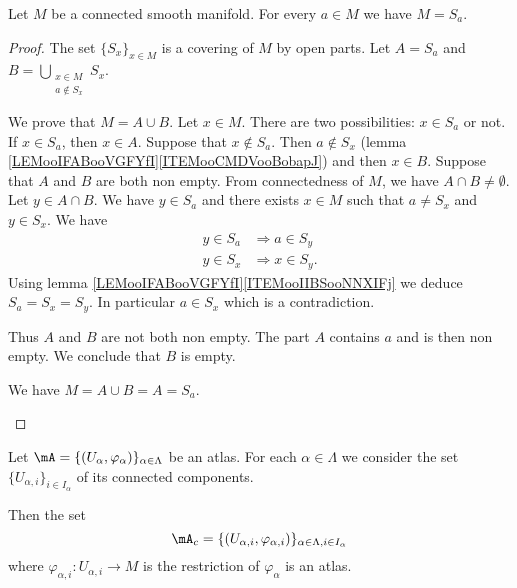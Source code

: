 \begin{proposition}		\label{PROPooFTFCooYTKaPF}
	Let \( M\) be a connected smooth manifold. For every \( a\in M\) we have \( M=S_a\).
\end{proposition}

\begin{proof}
	The set \( \{ S_x \}_{x\in M}\) is a covering of \( M\) by open parts. Let \( A=S_a\) and \( B=\bigcup_{\substack{ x\in M \\ a\not\in S_x }  }S_x \).
	\begin{subproof}
		\spitem[\( M=A\cup B\)]
		We prove that \( M=A\cup B\). Let \( x\in M\). There are two possibilities: \( x\in S_a\) or not. If \( x\in S_a\), then \( x\in A\). Suppose that \( x\not\in S_a\). Then \( a\not\in S_x\) (lemma \ref{LEMooIFABooVGFYfI}\ref{ITEMooCMDVooBobapJ}) and then \( x\in B\).
		\spitem[\( B=\emptyset\)]
		Suppose that \( A\) and \( B\) are both non empty. From connectedness of \( M\), we have \( A\cap B\neq\emptyset\). Let \( y\in A\cap B\). We have \( y\in S_a\) and there exists \( x\in M\) such that \( a\neq S_x\) and \( y\in S_x\). We have
		\begin{subequations}
			\begin{align}
				y\in S_a & \Rightarrow a\in S_y  \\
				y\in S_x & \Rightarrow x\in S_y.
			\end{align}
		\end{subequations}
		Using lemma \ref{LEMooIFABooVGFYfI}\ref{ITEMooIIBSooNNXIFj} we deduce \( S_a=S_x=S_y\). In particular \( a\in S_x\) which is a contradiction.

		Thus \( A\) and \( B\) are not both non empty. The part \( A\) contains \( a\) and is then non empty. We conclude that \( B\) is empty.

		\spitem[Conclusion]
		We have \( M=A\cup B=A=S_a\).
	\end{subproof}
\end{proof}

\begin{lemma}		\label{LEMooSDQUooWEagbY}
	Let \( \mA= \{ (U_{\alpha},\varphi_{\alpha}) \}_{\alpha\in \Lambda}\) be an atlas. For each \( \alpha\in \Lambda\) we consider the set \( \{ U_{\alpha,i} \}_{i\in I_{\alpha}}\) of its connected components.

	Then the set
	\begin{equation}
		\mA_c=\{ (U_{\alpha,i},\varphi_{\alpha,i}) \}_{\alpha\in\Lambda, i\in I_{\alpha}}
	\end{equation}
	where \(\varphi_{\alpha,i} \colon U_{\alpha,i}\to M  \) is the restriction of \( \varphi_{\alpha}\) is an atlas.
\end{lemma}

